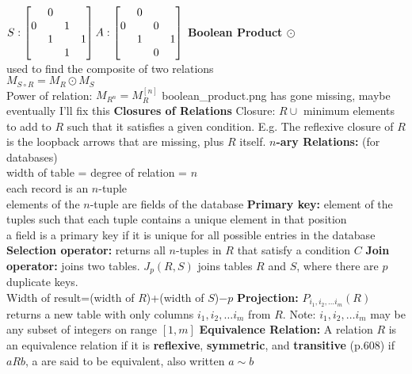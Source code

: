 \documentclass{article}
\newcommand{\upspace}{\vspace{0px}}
\newcommand{\bksp}{\hspace{-3px}}
\newcommand{\aaa}{\upspace \1\bksp}
\newcommand{\tbf}[1]{\textbf{#1}}
\begin{document}
\begin{multicols*}{2}
\begin{outline}[compactitem]
		$
	\\	S:\begin{bmatrix}
			 &0& & \\
			0& &1& \\
			 &1& &1\\
			 & &1& \\
		\end{bmatrix}	
		A:\begin{bmatrix}
			 &0& & \\
			0& &0& \\
			 &1& &1\\
			 & &0& \\
		\end{bmatrix}
		$
	\aaa \tbf{Boolean Product $\odot$}
	\\ used to find the composite of two relations
	\\ $M_{S\circ R} = M_R \odot M_S$
	\\ Power of relation: $M_{R^n} = M_R^{[n]}$
    {\large boolean\_product.png has gone missing, maybe eventually I'll fix this}
\0 \tbf{Closures of Relations}
	\aaa Closure: $R \cup $ minimum elements to add to $R$ such that it satisfies a given condition.
	\aaa E.g. The reflexive closure of $R$ is the loopback arrows that are missing, plus $R$ itself.
\0 \tbf{$n$-ary Relations:}
	\aaa (for databases)
	\\ width of table = degree of relation = $n$
	\\ each record is an $n$-tuple
	\\ elements of the $n$-tuple are fields of the database
	\aaa \tbf{Primary key:} element of the tuples such that each tuple contains a unique element in that position
	\\ a field is a primary key if it is unique for all possible entries in the database
	\aaa \tbf{Selection operator:} returns all $n$-tuples in $R$ that satisfy a condition $C$
	\aaa \tbf{Join operator:} joins two tables. $J_p(R,S)$ joins tables $R$ and $S$, where there are $p$ duplicate keys.
	\\ Width of result=(width of $R$)+(width of $S$)$-p$
	\aaa \tbf{Projection:} $P_{i_1,i_2,\ldots i_m}(R)$ returns a new table with only columns $i_1,i_2,\ldots i_m$ from $R$. Note: $i_1,i_2,\ldots i_m$ may be any subset of integers on range $[1,m]$
\0 \tbf{Equivalence Relation:}
	\aaa A relation $R$ is an equivalence relation if it is \tbf{reflexive}, \tbf{symmetric}, and \tbf{transitive} \hfill (p.608)
	\aaa if $aRb$, a are said to be equivalent, also written $a\sim b$ 


\end{outline}
\end{multicols*}
\end{document}
